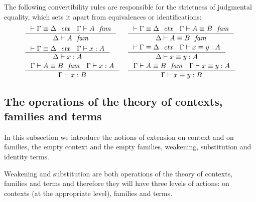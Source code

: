 The following convertibility rules are responsible for the strictness
of judgmental equality, which sets it apart from equivalences or identifications:
\begin{align*}
& \inference
  { \jctxeq{\Gamma}{\Delta}
    \jfam{\Gamma}{A}
    }
  { \jfam{\Delta}{A}
    }
& & \inference
    { \jctxeq{\Gamma}{\Delta}
      \jfameq{\Gamma}{A}{B}
      }
    { \jfameq{\Delta}{A}{B}
      }
    \\
& \inference
  { \jctxeq{\Gamma}{\Delta}
    \jterm{\Gamma}{A}{x}
    }
  { \jterm{\Delta}{A}{x}
    }
& & \inference
    { \jctxeq{\Gamma}{\Delta}
      \jtermeq{\Gamma}{A}{x}{y}
      }
    { \jtermeq{\Delta}{A}{x}{y}
      }
    \\
& \inference
  { \jfameq{\Gamma}{A}{B}
    \jterm{\Gamma}{A}{x}
    }
  { \jterm{\Gamma}{B}{x}
    }
& & \inference
    { \jfameq{\Gamma}{A}{B}
      \jtermeq{\Gamma}{A}{x}{y}
      }
    { \jtermeq{\Gamma}{B}{x}{y}
      }
\end{align*}

\subsection{The operations of the theory of contexts, families and terms}
In this subsection we introduce the notions of
extension on context and on families, the empty context and the empty families, 
weakening, 
substitution and identity terms. 

Weakening and substitution are both
operations of the theory of contexts, families and terms and therefore they will
have three levels of actions: on contexts (at the appropriate level), families
and terms.

